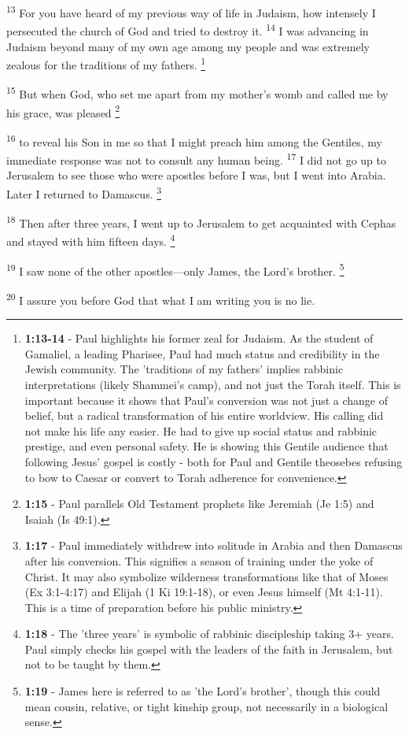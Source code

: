 \documentclass[12pt,twoside]{article}
\newcommand{\vs}[1]{\textsuperscript{#1}}
\newcommand{\vnote}[2]{%
  \begingroup
  \renewcommand\thefootnote{}%
  \footnote{\scriptsize \textbf{}#2}%
  \addtocounter{footnote}{-1}%
  \endgroup
}
\begin{document}
\vs{13} For you have heard of my previous way of life in Judaism, how intensely I persecuted the church of God and tried to destroy it.
\vs{14} I was advancing in Judaism beyond many of my own age among my people and was extremely zealous for the traditions of my fathers.\vnote{14}{\textbf{1:13-14} - Paul highlights his former zeal for Judaism. As the student of Gamaliel, a leading Pharisee, Paul had much status and credibility in the Jewish community. The 'traditions of my fathers' implies rabbinic interpretations (likely Shammei's camp), and not just the Torah itself. This is important because it shows that Paul's conversion was not just a change of belief, but a radical transformation of his entire worldview. His calling did not make his life any easier. He had to give up social status and rabbinic prestige, and even personal safety. He is showing this Gentile audience that following Jesus' gospel is costly - both for Paul and Gentile theosebes refusing to bow to Caesar or convert to Torah adherence for convenience.}
\vs{15} But when God, who set me apart from my mother's womb and called me by his grace, was pleased\vnote{15}{\textbf{1:15} - Paul parallels Old Testament prophets like Jeremiah (Je 1:5) and Isaiah (Is 49:1).}
\vs{16} to reveal his Son in me so that I might preach him among the Gentiles, my immediate response was not to consult any human being.
\vs{17} I did not go up to Jerusalem to see those who were apostles before I was, but I went into Arabia. Later I returned to Damascus.\vnote{17}{\textbf{1:17} - Paul immediately withdrew into solitude in Arabia and then Damascus after his conversion. This signifies a season of training under the yoke of Christ. It may also symbolize wilderness transformations like that of Moses (Ex 3:1-4:17) and Elijah (1 Ki 19:1-18), or even Jesus himself (Mt 4:1-11). This is a time of preparation before his public ministry.}

\vs{18} Then after three years, I went up to Jerusalem to get acquainted with Cephas and stayed with him fifteen days.\vnote{18}{\textbf{1:18} - The 'three years' is symbolic of rabbinic discipleship taking 3+ years. Paul simply checks his gospel with the leaders of the faith in Jerusalem, but not to be taught by them.}
\vs{19} I saw none of the other apostles---only James, the Lord's brother.\vnote{19}{\textbf{1:19} - James here is referred to as 'the Lord's brother', though this could mean cousin, relative, or tight kinship group, not necessarily in a biological sense.}
\vs{20} I assure you before God that what I am writing you is no lie.
\end{document}

